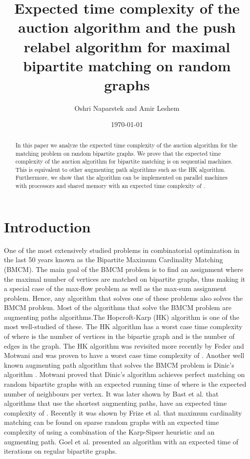 \documentclass[11pt,onecolumn]{article}
\begin{document}
\title{ Expected time complexity of the auction algorithm and the push relabel algorithm for maximal bipartite matching on random graphs }
\author{Oshri Naparstek and Amir Leshem}
\date{\today}
\maketitle
\begin{abstract}
In this paper we analyze the expected time complexity of the auction algorithm for the matching problem on random bipartite graphs. We prove that the expected time complexity of the auction algorithm for bipartite matching is  on sequential machines. This is equivalent to other augmenting path algorithms such as the HK algorithm. Furthermore, we show that the algorithm can be implemented on parallel machines with  processors and shared memory with an expected time complexity of .

\end{abstract}

\section {Introduction}
 One of the most extensively studied problems in combinatorial optimization in the last 50 years known as the Bipartite Maximum Cardinality Matching (BMCM). The main goal of the BMCM problem is to find an assignment where the maximal number of vertices are matched on bipartite graphs, thus making it a special case of the max-flow problem as well as the max-sum assignment problem. Hence, any algorithm that solves one of these problems also solves the BMCM problem. Most of the algorithms that solve the BMCM problem are augmenting paths algorithms.The Hopcroft-Karp (HK) algorithm \cite{hopcroft1973n} is one of the most well-studied of these. The HK algorithm has a worst case time complexity of  where  is the number of vertices in the bipartie graph and  is the number of edges in the graph. The HK algorithm was revisited more recently by Feder and Motwani \cite{feder1991clique} and was proven to have a worst case time complexity of . Another well known augmenting path algorithm that solves the BMCM problem is Dinic's algorithm \cite{dinic1970algorithm}. Motwani \cite{motwani1994average} proved that Dinic's algorithm achieves perfect matching on random bipartite graphs with an expected running time of  where  is the expected number of neighbours per vertex. It was later shown by Bast et al. \cite{bast2006matching} that algorithms that use the shortest augmenting paths, have an expected time complexity of . Recently it was shown by Frize et al. \cite{chebolu2010finding} that maximum cardinality matching can be found on sparse random graphs with an expected time complexity of  using a combination of the Karp-Sipser heuristic and an augmenting path. Goel et al. \cite{goel2010perfect} presented an algorithm with an expected time of  iterations on regular bipartite graphs.
\end{document}

